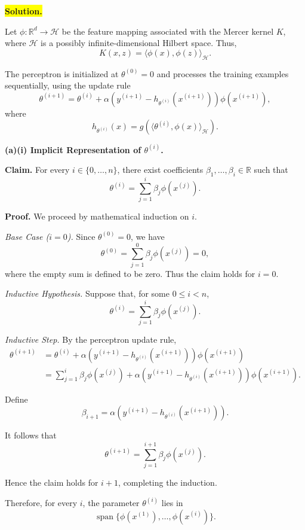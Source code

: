 \documentclass[11pt]{article}
\begin{document}
\medskip
\noindent\colorbox{yellow}{\textbf{Solution.}}
\vspace{3mm}

Let $\phi:\mathbb R^d\to\mathcal H$ be the feature
mapping associated with the Mercer kernel $K$, where
$\mathcal H$ is a possibly infinite-dimensional
Hilbert space. Thus,
\[
K(x,z)=\langle\phi(x),\phi(z)\rangle_{\mathcal H}.
\]

The perceptron is initialized at $\theta^{(0)}=0$
and processes the training examples sequentially,
using the update rule
\[
\theta^{(i+1)}
=
\theta^{(i)}
+
\alpha\left(
y^{(i+1)}
-h_{\theta^{(i)}}(x^{(i+1)})
\right)\phi(x^{(i+1)}),
\]
where
\[
h_{\theta^{(i)}}(x)
=
g\left(
\langle\theta^{(i)},\phi(x)\rangle_{\mathcal H}
\right).
\]

\bigskip
\noindent\textbf{(a)(i) Implicit Representation of $\theta^{(i)}$.}

\medskip
\noindent\textbf{Claim.}
For every $i\in\{0,\ldots,n\}$, there exist
coefficients $\beta_1,\ldots,\beta_i\in\mathbb R$
such that
\[
\boxed{
\theta^{(i)}
=
\sum_{j=1}^{i}\beta_j\phi(x^{(j)}).
}
\]

\noindent\textbf{Proof.}
We proceed by mathematical induction on $i$.

\textit{Base Case ($i=0$).}
Since $\theta^{(0)}=0$, we have
\[
\theta^{(0)}
=
\sum_{j=1}^{0}\beta_j\phi(x^{(j)})=0,
\]
where the empty sum is defined to be zero.
Thus the claim holds for $i=0$.

\textit{Inductive Hypothesis.}
Suppose that, for some $0\leq i<n$,
\[
\theta^{(i)}
=
\sum_{j=1}^{i}\beta_j\phi(x^{(j)}).
\]

\textit{Inductive Step.}
By the perceptron update rule,
\[
\begin{aligned}
\theta^{(i+1)}
&=
\theta^{(i)}
+
\alpha\left(
y^{(i+1)}
-h_{\theta^{(i)}}(x^{(i+1)})
\right)\phi(x^{(i+1)})\\
&=
\sum_{j=1}^{i}\beta_j\phi(x^{(j)})
+
\alpha\left(
y^{(i+1)}
-h_{\theta^{(i)}}(x^{(i+1)})
\right)\phi(x^{(i+1)}).
\end{aligned}
\]

Define
\[
\beta_{i+1}
=
\alpha\left(
y^{(i+1)}
-h_{\theta^{(i)}}(x^{(i+1)})
\right).
\]

It follows that
\[
\theta^{(i+1)}
=
\sum_{j=1}^{i+1}\beta_j\phi(x^{(j)}).
\]

Hence the claim holds for $i+1$, completing
the induction.

Therefore, for every $i$, the parameter
$\theta^{(i)}$ lies in
\[
\operatorname{span}
\{\phi(x^{(1)}),\ldots,\phi(x^{(i)})\}.
\]
\end{document}
